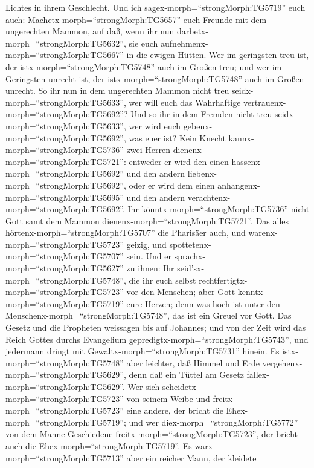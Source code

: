 Lichtes in ihrem Geschlecht.  Und ich
sagex-morph=``strongMorph:TG5719'' euch auch:
Machetx-morph=``strongMorph:TG5657'' euch Freunde mit dem ungerechten
Mammon, auf daß, wenn ihr nun darbetx-morph=``strongMorph:TG5632'', sie
euch aufnehmenx-morph=``strongMorph:TG5667'' in die ewigen Hütten.
 Wer im geringsten treu ist, der
istx-morph=``strongMorph:TG5748'' auch im Großen treu; und wer im
Geringsten unrecht ist, der istx-morph=``strongMorph:TG5748'' auch im
Großen unrecht.  So ihr nun in dem ungerechten Mammon nicht
treu seidx-morph=``strongMorph:TG5633'', wer will euch das Wahrhaftige
vertrauenx-morph=``strongMorph:TG5692''?  Und so ihr in dem
Fremden nicht treu seidx-morph=``strongMorph:TG5633'', wer wird euch
gebenx-morph=``strongMorph:TG5692'', was euer ist?  Kein
Knecht kannx-morph=``strongMorph:TG5736'' zwei Herren
dienenx-morph=``strongMorph:TG5721'': entweder er wird den einen
hassenx-morph=``strongMorph:TG5692'' und den andern
liebenx-morph=``strongMorph:TG5692'', oder er wird dem einen
anhangenx-morph=``strongMorph:TG5695'' und den andern
verachtenx-morph=``strongMorph:TG5692''. Ihr
könntx-morph=``strongMorph:TG5736'' nicht Gott samt dem Mammon
dienenx-morph=``strongMorph:TG5721''.  Das alles
hörtenx-morph=``strongMorph:TG5707'' die Pharisäer auch, und
warenx-morph=``strongMorph:TG5723'' geizig, und
spottetenx-morph=``strongMorph:TG5707'' sein.  Und er
sprachx-morph=``strongMorph:TG5627'' zu ihnen: Ihr
seid'sx-morph=``strongMorph:TG5748'', die ihr euch selbst
rechtfertigtx-morph=``strongMorph:TG5723'' vor den Menschen; aber Gott
kenntx-morph=``strongMorph:TG5719'' eure Herzen; denn was hoch ist unter
den Menschenx-morph=``strongMorph:TG5748'', das ist ein Greuel vor Gott.
 Das Gesetz und die Propheten weissagen bis auf Johannes;
und von der Zeit wird das Reich Gottes durchs Evangelium
gepredigtx-morph=``strongMorph:TG5743'', und jedermann dringt mit
Gewaltx-morph=``strongMorph:TG5731'' hinein.  Es
istx-morph=``strongMorph:TG5748'' aber leichter, daß Himmel und Erde
vergehenx-morph=``strongMorph:TG5629'', denn daß ein Tüttel am Gesetz
fallex-morph=``strongMorph:TG5629''.  Wer sich
scheidetx-morph=``strongMorph:TG5723'' von seinem Weibe und
freitx-morph=``strongMorph:TG5723'' eine andere, der bricht die
Ehex-morph=``strongMorph:TG5719''; und wer
diex-morph=``strongMorph:TG5772'' von dem Manne Geschiedene
freitx-morph=``strongMorph:TG5723'', der bricht auch die
Ehex-morph=``strongMorph:TG5719''.  Es
warx-morph=``strongMorph:TG5713'' aber ein reicher Mann, der kleidete
